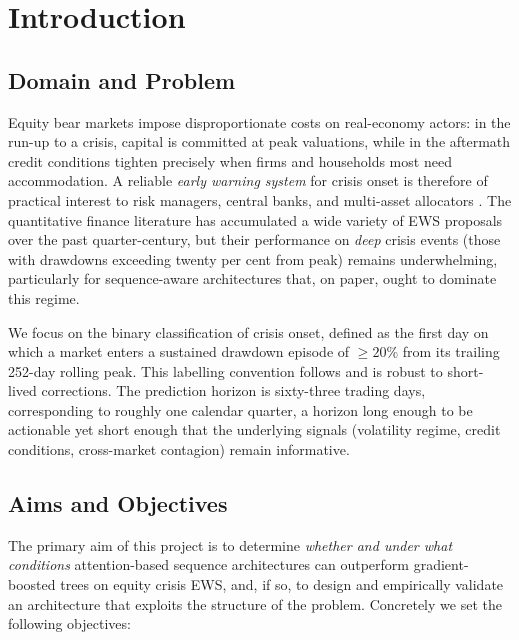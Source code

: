 \documentclass[11pt,a4paper]{article}
\begin{document}
\section{Introduction}
\label{sec:intro}

\subsection{Domain and Problem}
Equity bear markets impose disproportionate costs on real-economy actors: in
the run-up to a crisis, capital is committed at peak valuations, while in the
aftermath credit conditions tighten precisely when firms and households most
need accommodation. A reliable \emph{early warning system} for crisis onset
is therefore of practical interest to risk managers, central banks, and
multi-asset allocators \citep{kaminsky1999leading,reinhartrogoff2009}. The
quantitative finance literature has accumulated a wide variety of EWS
proposals over the past quarter-century, but their performance on \emph{deep}
crisis events (those with drawdowns exceeding twenty per cent from peak)
remains underwhelming, particularly for sequence-aware architectures
that, on paper, ought to dominate this regime.

We focus on the binary classification of crisis onset, defined as the first
day on which a market enters a sustained drawdown episode of $\geq 20\%$ from
its trailing 252-day rolling peak. This labelling convention follows
\citet{dichtl2023ews} and is robust to short-lived corrections. The
prediction horizon is sixty-three trading days, corresponding to roughly one
calendar quarter, a horizon long enough to be actionable yet short enough
that the underlying signals (volatility regime, credit conditions,
cross-market contagion) remain informative.

\subsection{Aims and Objectives}
The primary aim of this project is to determine \emph{whether and under what
conditions} attention-based sequence architectures can outperform
gradient-boosted trees on equity crisis EWS, and, if so, to design and
empirically validate an architecture that exploits the structure of the
problem. Concretely we set the following objectives:
\end{document}
